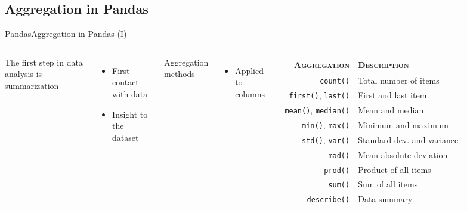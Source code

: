 \documentclass[10pt,compress]{beamer} %
\begin{document}
\subsection{Aggregation in Pandas}
\begin{frame}[fragile]{Pandas}{Aggregation in Pandas (I)}
	\begin{columns}
		The first step in data analysis is summarization
		\begin{itemize}
			\item First contact with data
			\item Insight to the dataset
		\end{itemize}
		Aggregation methods
		\begin{itemize}
			\item Applied to columns
		\end{itemize}
	
      	\begin{tabularx}{\textwidth}{rl}
			\hline
       		\textsc{Aggregation} &  \textsc{Description}\\ \hline
       		\texttt{count()}    & 	Total number of items \\
       		\texttt{first()}, \texttt{last()} & First and last item \\
       		\texttt{mean()}, \texttt{median()} & Mean and median \\
       		\texttt{min()}, \texttt{max()} & Minimum and maximum \\
       		\texttt{std()}, \texttt{var()} & Standard dev. and variance \\
       		\texttt{mad()} & Mean absolute deviation \\
       		\texttt{prod()} & Product of all items \\
       		\texttt{sum()} & Sum of all items \\
       		\texttt{describe()} & Data summary \\\hline
    	\end{tabularx}
	\end{columns}
\end{frame}
\end{document}
